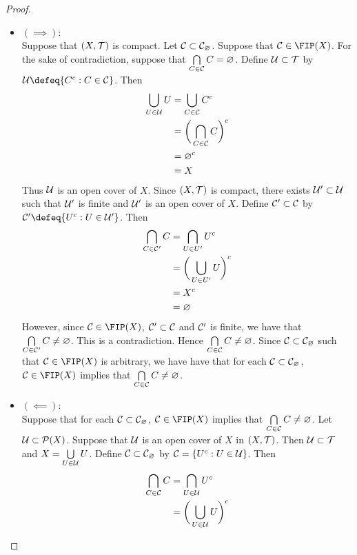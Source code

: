 \documentclass{book}
\begin{document}
	\begin{proof}\
		\begin{itemize}
			\item $(\implies)$: \\
			Suppose that $(X, \mathcal{T})$ is compact. Let $\mathcal{C} \subset \mathcal{C}_{\varnothing}$. Suppose that $\MC \in \FIP(X)$. For the sake of contradiction, suppose that $\bigcap\limits_{C \in \mathcal{C}} C = \varnothing$. Define $\mathcal{U} \subset \mathcal{T}$ by $\MU \defeq \{C^c: C \in \MC\}$. Then 
			\begin{align*}
				\bigcup_{U \in \mathcal{U}} U
				& = \bigcup_{C \in \mathcal{C}} C^c \\
				& = \bigg( \bigcap_{C \in \mathcal{C}} C \bigg)^c \\
				& = \varnothing^c \\
				& = X
			\end{align*}
			Thus $\mathcal{U}$ is an open cover of $X$. Since $(X, \mathcal{T})$ is compact, there exists $\mathcal{U}' \subset \mathcal{U}$ such that $\mathcal{U}'$ is finite and $\mathcal{U}'$ is an open cover of $X$. Define $\mathcal{C}' \subset \mathcal{C}$ by $\MC' \defeq \{U^c: U \in \MU'\}$. Then 
			\begin{align*}
				\bigcap_{C \in \mathcal{C}'} C 
				& = \bigcap_{U \in U'} U^c \\
				& = \bigg( \bigcup_{U \in U'} U \bigg)^c \\
				& = X^c \\
				& = \varnothing
			\end{align*}  
			However, since $\MC \in \FIP(X)$, $\mathcal{C}' \subset \mathcal{C}$ and $\mathcal{C}'$ is finite, we have that $\bigcap\limits_{C \in \mathcal{C}'} C \neq \varnothing$. This is a contradiction. Hence $\bigcap\limits_{C \in \mathcal{C}} C \neq \varnothing$. Since $\mathcal{C} \subset \mathcal{C}_{\varnothing}$ such that $\MC \in \FIP(X)$ is arbitrary, we have have that for each $\mathcal{C} \subset \mathcal{C}_\varnothing$, $\MC \in \FIP(X)$ implies that $\bigcap\limits_{C \in \mathcal{C}} C \neq \varnothing$. 
			\item $(\impliedby)$: \\
			Suppose that for each $\mathcal{C} \subset \mathcal{C}_\varnothing$, $\MC \in \FIP(X)$ implies that $\bigcap\limits_{C \in \mathcal{C}} C \neq \varnothing$. Let $\mathcal{U} \subset \mathcal{P}(X)$. Suppose that $\mathcal{U}$ is an open cover of $X$ in $(X, \mathcal{T})$. Then $\mathcal{U} \subset \mathcal{T}$ and $X = \bigcup\limits_{U \in \mathcal{U}} U$. Define $\mathcal{C} \subset \mathcal{C}_{\varnothing}$ by $\mathcal{C} = \{U^c: U \in \mathcal{U}\}$. Then 
			\begin{align*}
				\bigcap_{C \in \MC} C
				& = \bigcap_{U \in \MU} U^c \\
				& = \bigg( \bigcup_{U \in \MU} U \bigg)^c \\

\end{align*}
\end{itemize}
\end{proof}
\end{document}
